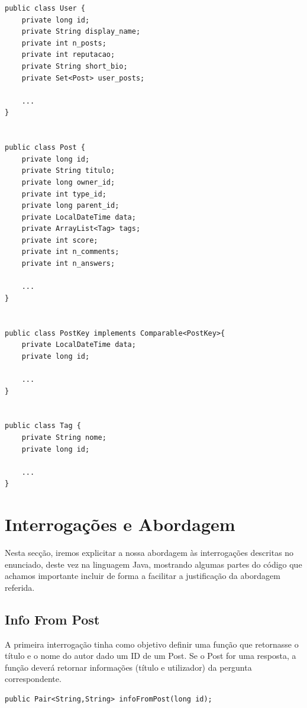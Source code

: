 \documentclass[a4paper, 11pt, oneside]{article}
\begin{document}
\begin{lstlisting}
public class User {	
    private long id;
    private String display_name;
    private int n_posts;
    private int reputacao;
    private String short_bio;
    private Set<Post> user_posts;

    ...
}


public class Post {
    private long id;
    private String titulo;
    private long owner_id;
    private int type_id;
    private long parent_id;
    private LocalDateTime data;
    private ArrayList<Tag> tags;
    private int score;
    private int n_comments;
    private int n_answers;

    ...
}


public class PostKey implements Comparable<PostKey>{
    private LocalDateTime data;
    private long id;

    ...
}


public class Tag {
    private String nome;
    private long id;

    ...
}

\end{lstlisting}





\section{Interrogações e Abordagem}

\label{queries}
Nesta secção, iremos explicitar a nossa abordagem às interrogações descritas no enunciado, deste vez na linguagem Java, mostrando algumas partes do código que 
achamos importante incluir de forma a facilitar a justificação da abordagem referida.


\subsection{Info From Post}

A primeira interrogação tinha como objetivo definir uma função que retornasse o título e o nome do autor dado um ID de um Post. Se o Post for uma resposta, a função 
deverá retornar informações (título e utilizador) da pergunta correspondente.

\begin{lstlisting}
public Pair<String,String> infoFromPost(long id);
\end{lstlisting}
\end{document}
